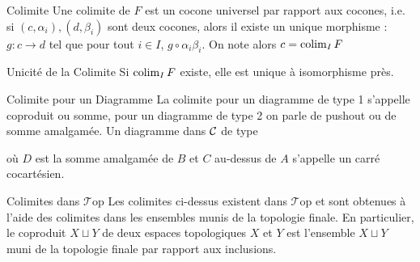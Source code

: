 \documentclass{cours}
\newcommand{\Top}{\mathcal{T}\mathrm{op}}
\begin{document}
\begin{définition}{Colimite}{}
    Une colimite de $F$ est un cocone universel par rapport aux cocones, i.e. si $(c, \alpha_{i}), (d, \beta_{i})$ sont deux cocones, alors il existe un unique morphisme : $g : c\to d$ tel que pour tout $i \in I$, $g \circ \alpha_{i} \beta_{i}$. On note alors $c = \operatorname{colim}_{I} F$
\end{définition}
\begin{propositionfr}{Unicité de la Colimite}{}
Si $\operatorname{colim}_{I}F$ existe, elle est unique à isomorphisme près.
\end{propositionfr}

\begin{définition}{Colimite pour un Diagramme}{}
    La colimite pour un diagramme de type 1 s'appelle coproduit ou somme, pour un diagramme de type 2 on parle de pushout ou de somme amalgamée. Un diagramme dans $\mathcal{C}$ de type 
    \begin{center}
    \end{center}
    où $D$ est la somme amalgamée de $B$ et $C$ au-dessus de $A$ s'appelle un carré cocartésien.
\end{définition}

\begin{propositionfr}{Colimites dans $\Top$}{}
    Les colimites ci-dessus existent dans $\Top$ et sont obtenues à l'aide des colimites dans les ensembles munis de la topologie finale. En particulier, le coproduit $X\sqcup Y$ de deux espaces topologiques $X$ et $Y$ est l'ensemble $X \sqcup Y$ muni de la topologie finale par rapport aux inclusions. 
\end{propositionfr}
\end{document}

